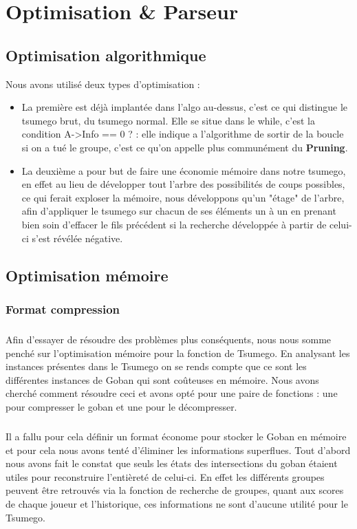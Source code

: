 \chapter{Optimisation \& Parseur}\label{chap:Optimisation}
    \section{Optimisation algorithmique}
        Nous avons utilisé deux types d'optimisation :
        \begin{itemize}
            \item La première est déjà implantée dans l'algo au-dessus, c'est ce qui distingue le tsumego brut, du tsumego normal. Elle se situe dans le while, c'est la condition A->Info == 0 ? : elle indique a l'algorithme de sortir de la boucle si on a tué le groupe, c'est ce qu'on appelle plus communément du \textbf{Pruning}.\\
            \item La deuxième a pour but de faire une économie mémoire dans notre tsumego, en effet au lieu de développer tout l'arbre des possibilités de coups possibles, ce qui ferait exploser la mémoire, nous développons qu'un "étage" de l'arbre, afin d'appliquer le tsumego sur chacun de ses éléments un à un en prenant bien soin d'effacer le fils précédent si la recherche développée à partir de celui-ci s'est révélée négative.
        \end{itemize}
            
    \section{Optimisation mémoire}
        \subsection{Format compression}
            \paragraph{}Afin d’essayer de résoudre des problèmes plus conséquents, nous nous somme penché sur l’optimisation mémoire pour la fonction de Tsumego. En analysant les instances présentes dans le Tsumego on se rends compte que ce sont les différentes instances de Goban qui sont coûteuses en mémoire. Nous avons cherché comment résoudre ceci et avons opté pour une paire de fonctions : une pour compresser le goban et une pour le décompresser.
    
            \paragraph{}Il a fallu pour cela définir un format économe pour stocker le Goban en mémoire et pour cela nous avons tenté d’éliminer les informations superflues. Tout d’abord nous avons fait le constat que seuls les états des intersections du goban étaient utiles pour reconstruire l’entièreté de celui-ci. En effet les différents groupes peuvent être retrouvés via la fonction de recherche de groupes, quant aux scores de chaque joueur et l’historique, ces informations ne sont d’aucune utilité pour le Tsumego. 
            
